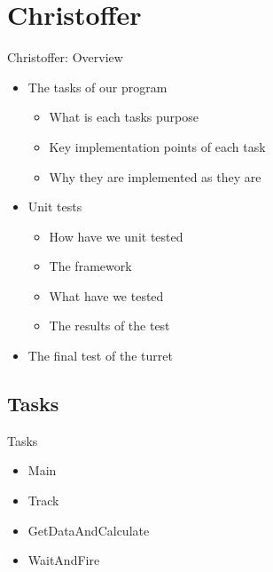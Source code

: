\section{Christoffer}

\begin{frame}{Christoffer: Overview}
\begin{itemize}
  \item The tasks of our program
  		\begin{itemize}
  			\item What is each tasks purpose
  			\item Key implementation points of each task
  			\item Why they are implemented as they are  
		\end{itemize}
  \item Unit tests
  		\begin{itemize}
  			\item How have we unit tested
  			\item The framework
  			\item What have we tested
  			\item The results of the test
		\end{itemize}
  \item The final test of the turret
\end{itemize}
\end{frame}

\subsection{Tasks}
\begin{frame}{Tasks}
\begin{itemize}
  \item Main
  \item Track
  \item GetDataAndCalculate
  \item WaitAndFire
\end{itemize}
\end{frame}

